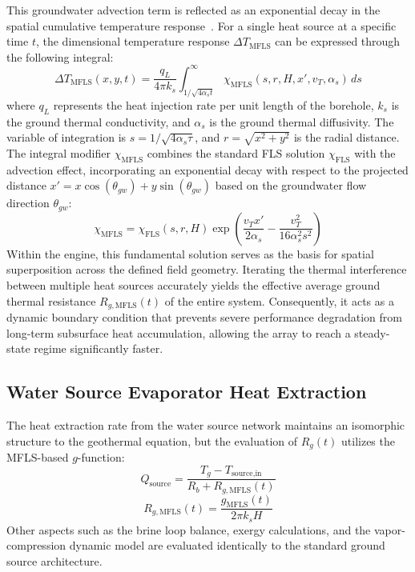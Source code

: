 This groundwater advection term is reflected as an exponential decay in the spatial cumulative temperature response~\cite{molina2011moving}. For a single heat source at a specific time $t$, the dimensional temperature response $\Delta T_{\text{MFLS}}$ can be expressed through the following integral:
\begin{equation}\label{eq:mfls-integral}
  \Delta T_{\text{MFLS}}(x, y, t) = \frac{q_L}{4 \pi k_s} \int_{1/\sqrt{4 \alpha_s t}}^{\infty} \chi_{\text{MFLS}}(s, r, H, x', v_T, \alpha_s) \, ds
\end{equation}
where $q_L$ represents the heat injection rate per unit length of the borehole, $k_s$ is the ground thermal conductivity, and $\alpha_s$ is the ground thermal diffusivity. The variable of integration is $s=1/\sqrt{4 \alpha_s \tau}$, and $r = \sqrt{x^2+y^2}$ is the radial distance. The integral modifier $\chi_{\text{MFLS}}$ combines the standard FLS solution $\chi_{\text{FLS}}$ with the advection effect, incorporating an exponential decay with respect to the projected distance $x' = x \cos(\theta_{gw}) + y \sin(\theta_{gw})$ based on the groundwater flow direction $\theta_{gw}$:
\begin{equation}\label{eq:chi-mfls}
  \chi_{\text{MFLS}} = \chi_{\text{FLS}}(s, r, H) \exp\left( \frac{v_T x'}{2 \alpha_s} - \frac{v_T^2}{16 \alpha_s^2 s^2}\right)
\end{equation}
Within the engine, this fundamental solution serves as the basis for spatial superposition across the defined field geometry. Iterating the thermal interference between multiple heat sources accurately yields the effective average ground thermal resistance $R_{g,\text{MFLS}}(t)$ of the entire system. Consequently, it acts as a dynamic boundary condition that prevents severe performance degradation from long-term subsurface heat accumulation, allowing the array to reach a steady-state regime significantly faster.

\subsection{Water Source Evaporator Heat Extraction}

The heat extraction rate from the water source network maintains an isomorphic structure to the geothermal equation, but the evaluation of $R_g(t)$ utilizes the MFLS-based $g$-function:
\begin{equation}\label{eq:wshp-Qground}
  Q_\text{source} = \frac{T_g - T_\text{source,in}}{R_b + R_{g,\text{MFLS}}(t)}
\end{equation}
\begin{equation}\label{eq:wshpb-Rg-mfls}
  R_{g,\text{MFLS}}(t) = \frac{g_\text{MFLS}(t)}{2\pi k_s H}
\end{equation}
Other aspects such as the brine loop balance, exergy calculations, and the vapor-compression dynamic model are evaluated identically to the standard ground source architecture.
